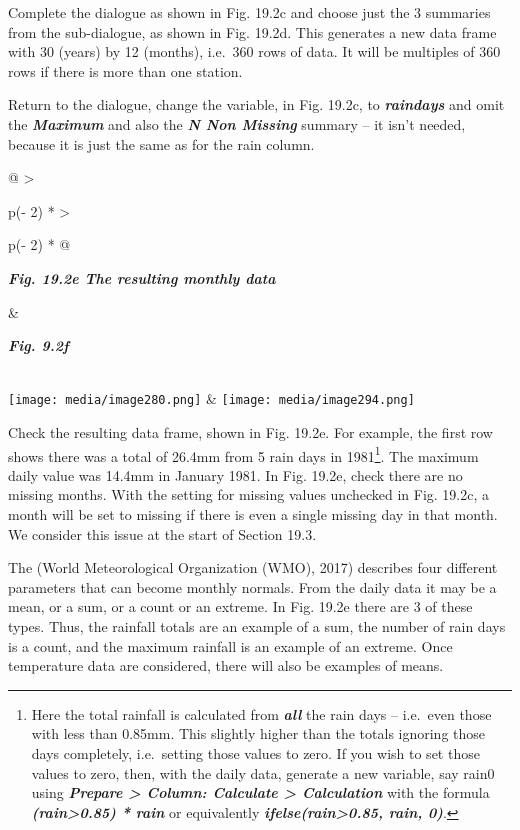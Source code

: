 \documentclass[
  letterpaper,
  DIV=11,
  numbers=noendperiod]{scrreprt}
\begin{document}
Complete the dialogue as shown in Fig. 19.2c and choose just the 3
summaries from the sub-dialogue, as shown in Fig. 19.2d. This generates
a new data frame with 30 (years) by 12 (months), i.e.~360 rows of data.
It will be multiples of 360 rows if there is more than one station.

Return to the dialogue, change the variable, in Fig. 19.2c, to
\textbf{\emph{raindays}} and omit the \textbf{\emph{Maximum}} and also
the \textbf{\emph{N Non Missing}} summary -- it isn't needed, because it
is just the same as for the rain column.

\begin{longtable}[]{@{}
  >{\raggedright\arraybackslash}p{(\columnwidth - 2\tabcolsep) * }
  >{\raggedright\arraybackslash}p{(\columnwidth - 2\tabcolsep) * }@{}}
\toprule\noalign{}
\begin{minipage}[b]{\linewidth}\raggedright
\textbf{\emph{Fig. 19.2e The resulting monthly data}}
\end{minipage} & \begin{minipage}[b]{\linewidth}\raggedright
\textbf{\emph{Fig. 9.2f}}
\end{minipage} \\
\midrule\noalign{}
\endhead
\bottomrule\noalign{}
\endlastfoot
\texttt{[image: media/image280.png]} &
\texttt{[image: media/image294.png]} \\
\end{longtable}

Check the resulting data frame, shown in Fig. 19.2e. For example, the
first row shows there was a total of 26.4mm from 5 rain days in
1981\footnote{Here the total rainfall is calculated from
  \textbf{\emph{all}} the rain days -- i.e.~even those with less than
  0.85mm. This slightly higher than the totals ignoring those days
  completely, i.e.~setting those values to zero. If you wish to set
  those values to zero, then, with the daily data, generate a new
  variable, say rain0 using \textbf{\emph{Prepare \textgreater{} Column:
  Calculate \textgreater{} Calculation}} with the formula
  \textbf{\emph{(rain\textgreater0.85) * rain}} or equivalently
  \textbf{\emph{ifelse(rain\textgreater0.85, rain, 0)}}.}. The maximum
daily value was 14.4mm in January 1981. In Fig. 19.2e, check there are
no missing months. With the setting for missing values unchecked in Fig.
19.2c, a month will be set to missing if there is even a single missing
day in that month. We consider this issue at the start of Section 19.3.

The (World Meteorological Organization (WMO), 2017) describes four
different parameters that can become monthly normals. From the daily
data it may be a mean, or a sum, or a count or an extreme. In Fig. 19.2e
there are 3 of these types. Thus, the rainfall totals are an example of
a sum, the number of rain days is a count, and the maximum rainfall is
an example of an extreme. Once temperature data are considered, there
will also be examples of means.
\end{document}
